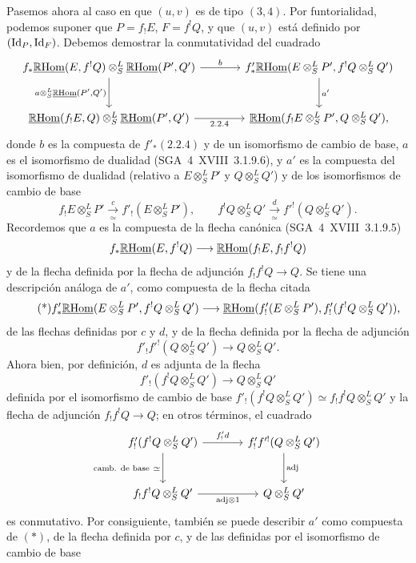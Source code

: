 \enlargethispage{-2\baselineskip}
Pasemos ahora al caso en que $(u,v)$ es de tipo $(3,4)$. Por funtorialidad, podemos suponer que $P=f_{!}E$, $F=f^{!}Q$, y que $(u,v)$ está definido por $(\mathrm{Id}_P,\mathrm{Id}_F)$. Debemos demostrar la conmutatividad del cuadrado
\[
\begin{tikzcd}[column sep=large,row sep=large]
f_*\uRHom(E,f^!Q)\otimes^L_S\uRHom(P',Q') \arrow[r,"b"] \arrow[d,"{a\otimes^L_S\uRHom(P',Q')}"'] & f'_*\uRHom(E\otimes^L_SP',f^!Q\otimes^L_SQ') \arrow[d,"a'"]\\
\uRHom(f_!E,Q)\otimes^L_S\uRHom(P',Q') \arrow[r,"2.2.4"'] & \uRHom(f_!E\otimes^L_SP',Q\otimes^L_SQ'),
\end{tikzcd}
\]
donde $b$ es la compuesta de $f'_*(2.2.4)$ y de un isomorfismo de cambio de base, $a$ es el isomorfismo de dualidad (SGA~4~XVIII~3.1.9.6), y $a'$ es la compuesta del isomorfismo de dualidad (relativo a $E\otimes^L_SP'$ y $Q\otimes^L_SQ'$) y de los isomorfismos de cambio de base
\[
f_!E\otimes^L_SP'\xrightarrow[\simeq]{c}f'_!(E\otimes^L_SP'),
\qquad
f^!Q\otimes^L_SQ'\xrightarrow[\simeq]{d}f'^!(Q\otimes^L_SQ').
\]
Recordemos que $a$ es la compuesta de la flecha canónica (SGA~4~XVIII~3.1.9.5)
\[
f_*\underline{\mathbb{R}\mathrm{Hom}}(E,f^!Q)\longrightarrow\underline{\mathbb{R}\mathrm{Hom}}(f_!E,f_!f^!Q)
\]
y de la flecha definida por la flecha de adjunción $f_!f^!Q\to Q$. Se tiene una descripción análoga de $a'$, como compuesta de la flecha citada
\begin{equation}\tag{*}
f'_*\underline{\mathbb{R}\mathrm{Hom}}(E\otimes^L_SP',f^!Q\otimes^L_SQ')\longrightarrow
\underline{\mathbb{R}\mathrm{Hom}}(f'_!(E\otimes^L_SP'),f'_!(f^!Q\otimes^L_SQ')),
\end{equation}
de las flechas definidas por $c$ y $d$, y de la flecha definida por la flecha de adjunción
\[
f'_!f'^!(Q\otimes^L_SQ')\longrightarrow Q\otimes^L_SQ'.
\]
Ahora bien, por definición, $d$ es adjunta de la flecha
\[
f'_!(f^!Q\otimes^L_SQ')\longrightarrow Q\otimes^L_SQ'
\]
definida por el isomorfismo de cambio de base $f'_!(f^!Q\otimes^L_SQ')\simeq f_!f^!Q\otimes^L_SQ'$ y la flecha de adjunción $f_!f^!Q\to Q$; en otros términos, el cuadrado
\[
\begin{tikzcd}[column sep=large,row sep=large]
f'_!(f^!Q\otimes^L_SQ') \arrow[r,"{f'_!d}"] \arrow[d,"{\text{camb. de base}\ \simeq}"'] & f'_!f'^!(Q\otimes^L_SQ') \arrow[d,"\mathrm{adj}"]\\
f_!f^!Q\otimes^L_SQ' \arrow[r,"{\mathrm{adj}\otimes 1}"'] & Q\otimes^L_SQ'
\end{tikzcd}
\]
es conmutativo. Por consiguiente, también se puede describir $a'$ como compuesta de $(*)$, de la flecha definida por $c$, y de las definidas por el isomorfismo de cambio de base
